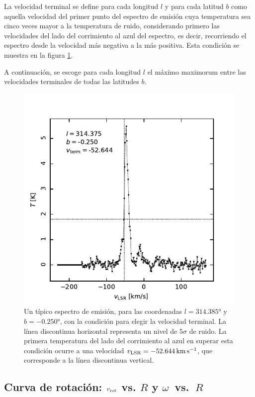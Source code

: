 La velocidad terminal se define para cada longitud $l$ y para cada latitud $b$ como aquella velocidad del primer punto del espectro de emisión cuya temperatura sea cinco veces mayor a la temperatura de ruido, considerando primero las velocidades del lado del corrimiento al azul del espectro, es decir, recorriendo el espectro desde la velocidad más negativa a la más positiva. Esta condición se muestra en la figura \ref{fig:vterminal}.

A continuación, se escoge para cada longitud $l$ el máximo maximorum entre las velocidades terminales de todas las latitudes $b$.

\begin{figure}[htbp]
	\includegraphics{rsc/vterminal.pdf}
	\caption{Un típico espectro de emisión, para las coordenadas $l=\ang{314.385}$ y $b=\ang{-0.250}$, con la condición para elegir la velocidad terminal. La línea discontinua horizontal representa un nivel de $5\sigma$ de ruido. La primera temperatura del lado del corrimiento al azul en superar esta condición ocurre a una velocidad $v_\textnormal{LSR}=\SI{-52.644}{\kilo\metre\per\second}$, que corresponde a la línea discontinua vertical.}
	\label{fig:vterminal}
\end{figure}

\subsection{Curva de rotación: $v_{\textnormal{rot}}$ vs. $R$ y \mbox{$\omega$ vs. $R$}}

